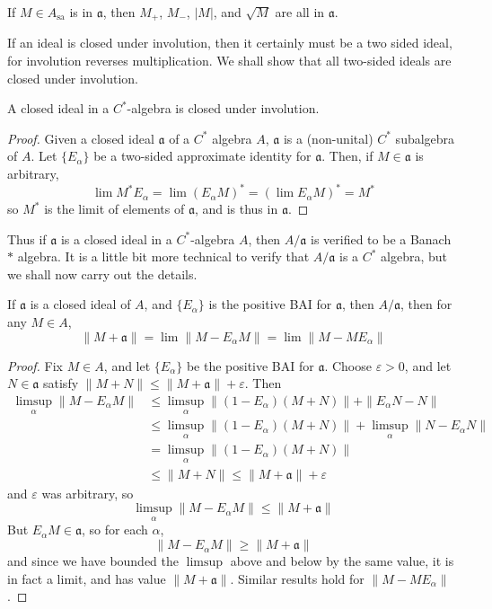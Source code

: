\begin{corollary}
    If $M \in A_{\text{sa}}$ is in $\mathfrak{a}$, then $M_+$, $M_-$, $|M|$, and $\sqrt{M}$ are all in $\mathfrak{a}$.
\end{corollary}

If an ideal is closed under involution, then it certainly must be a two sided ideal, for involution reverses multiplication. We shall show that all two-sided ideals are closed under involution.

\begin{prop}
    A closed ideal in a $C^*$-algebra is closed under involution.
\end{prop}
\begin{proof}
    Given a closed ideal $\mathfrak{a}$ of a $C^*$ algebra $A$, $\mathfrak{a}$ is a (non-unital) $C^*$ subalgebra of $A$. Let $\{ E_\alpha \}$ be a two-sided approximate identity for $\mathfrak{a}$. Then, if $M \in \mathfrak{a}$ is arbitrary,
    \[ \lim M^*E_\alpha = \lim (E_\alpha M)^* = (\lim E_\alpha M)^* = M^* \]
    so $M^*$ is the limit of elements of $\mathfrak{a}$, and is thus in $\mathfrak{a}$.
\end{proof}

Thus if $\mathfrak{a}$ is a closed ideal in a $C^*$-algebra $A$, then $A/\mathfrak{a}$ is verified to be a Banach $*$ algebra. It is a little bit more technical to verify that $A/\mathfrak{a}$ is a $C^*$ algebra, but we shall now carry out the details.

\begin{lemma}
    If $\mathfrak{a}$ is a closed ideal of $A$, and $\{ E_\alpha \}$ is the positive BAI for $\mathfrak{a}$, then $A/\mathfrak{a}$, then for any $M \in A$,
    \[ \| M + \mathfrak{a} \| = \lim \| M - E_\alpha M \| = \lim \| M - M E_\alpha \| \]
\end{lemma}
\begin{proof}
    Fix $M \in A$, and let $\{ E_\alpha \}$ be the positive BAI for $\mathfrak{a}$. Choose $\varepsilon > 0$, and let $N \in \mathfrak{a}$ satisfy $\| M + N \| \leq \| M + \mathfrak{a} \| + \varepsilon$. Then
    \begin{align*}
        \limsup_\alpha \| M - E_\alpha M \| &\leq \limsup_\alpha \| (1 - E_\alpha)(M + N) \| + \| E_\alpha N - N \|\\
        &\leq \limsup_\alpha \| (1 - E_\alpha)(M + N) \| + \limsup_\alpha \| N - E_\alpha N \|\\
        &= \limsup_\alpha \| (1 - E_\alpha) (M + N) \|\\
        &\leq \| M + N \| \leq \| M + \mathfrak{a} \| + \varepsilon
    \end{align*}
    and $\varepsilon$ was arbitrary, so
    \[ \limsup_\alpha \| M - E_\alpha M \| \leq \| M + \mathfrak{a} \| \]
    But $E_\alpha M \in \mathfrak{a}$, so for each $\alpha$,
    \[ \| M - E_\alpha M \| \geq \| M + \mathfrak{a} \| \]
    and since we have bounded the $\limsup$ above and below by the same value, it is in fact a limit, and has value $\| M + \mathfrak{a} \|$. Similar results hold for $\| M - M E_\alpha \|$.
\end{proof}

